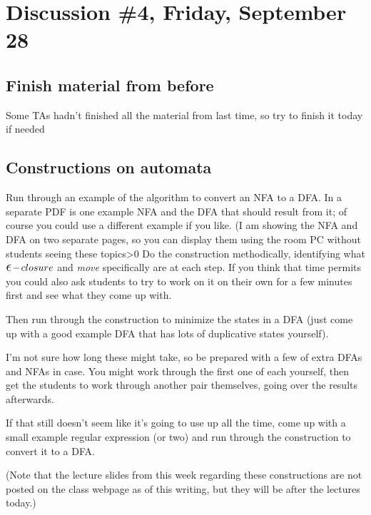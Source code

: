 \documentclass[12pt]{article}
\newcommand{\myepsilon}{\mbox{\Large\ensuremath{\epsilon}}}
\begin{document}

  \section{Discussion \#4, Friday, September 28}

    \subsection{Finish material from before}

      Some TAs hadn't finished all the material from last time, so try to
    finish it today if needed
  
    \subsection{Constructions on automata}

    Run through an example of the algorithm to convert an NFA to a DFA.  In
    a separate PDF is one example NFA and the DFA that should result from
    it; of course you could use a different example if you like.  (I am
    showing the NFA and DFA on two separate pages, so you can display them
    using the room PC without students seeing these topics>0 Do the
    construction methodically, identifying what
    $\myepsilon\hspace{-.5mm}-\hspace{-.5mm}closure$ and \emph{move}
    specifically are at each step.  If you think that time permits you could
    also ask students to try to work on it on their own for a few minutes
    first and see what they come up with.

      Then run through the construction to minimize the states in a DFA (just
    come up with a good example DFA that has lots of duplicative states
    yourself).

      I'm not sure how long these might take, so be prepared with a few of
    extra DFAs and NFAs in case.  You might work through the first one of
    each yourself, then get the students to work through another pair
    themselves, going over the results afterwards.

      If that still doesn't seem like it's going to use up all the time, come
    up with a small example regular expression (or two) and run through the
    construction to convert it to a DFA.

      (Note that the lecture slides from this week regarding these
    constructions are not posted on the class webpage as of this writing,
    but they will be after the lectures today.)
  
\end{document}
